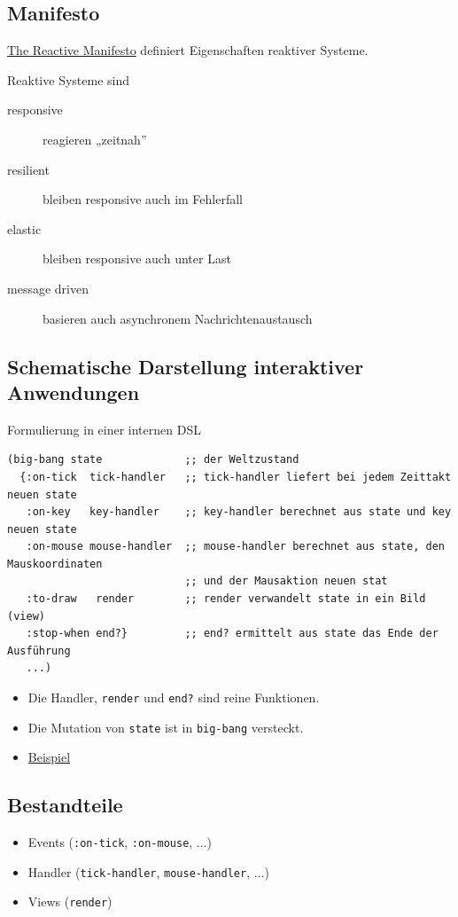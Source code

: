 \documentclass[a4paper]{article}
\begin{document}
\subsection*{Manifesto}
\label{sec:org3425ea1}
\href{https://www.reactivemanifesto.org}{The Reactive Manifesto} definiert Eigenschaften reaktiver Systeme.

Reaktive Systeme sind
\begin{description}
\item[{responsive}] reagieren „zeitnah”
\item[{resilient}] bleiben responsive auch im Fehlerfall
\item[{elastic}] bleiben responsive auch unter Last
\item[{message driven}] basieren auch asynchronem Nachrichtenaustausch
\end{description}
\subsection*{Schematische Darstellung interaktiver Anwendungen}
\label{sec:org78ee706}
Formulierung in einer internen DSL
\begin{verbatim}
(big-bang state             ;; der Weltzustand
  {:on-tick  tick-handler   ;; tick-handler liefert bei jedem Zeittakt neuen state
   :on-key   key-handler    ;; key-handler berechnet aus state und key neuen state
   :on-mouse mouse-handler  ;; mouse-handler berechnet aus state, den Mauskoordinaten
                            ;; und der Mausaktion neuen stat
   :to-draw   render        ;; render verwandelt state in ein Bild (view)
   :stop-when end?}         ;; end? ermittelt aus state das Ende der Ausführung
   ...)
\end{verbatim}
\begin{itemize}
\item Die Handler, \texttt{render} und \texttt{end?} sind reine Funktionen.
\item Die Mutation von \texttt{state} ist in \texttt{big-bang} versteckt.
\item \href{file:///Users/jb/Google-Drive/Planung/Clojure-Script/big-bang/src/bb/my\_scetch.cljs}{Beispiel}
\end{itemize}
\subsection*{Bestandteile}
\label{sec:org67b543a}
\begin{itemize}
\item Events  (\texttt{:on-tick}, \texttt{:on-mouse}, \(\ldots\))
\item Handler (\texttt{tick-handler}, \texttt{mouse-handler},  \(\ldots\))
\item Views   (\texttt{render})
\end{itemize}
\end{document}
